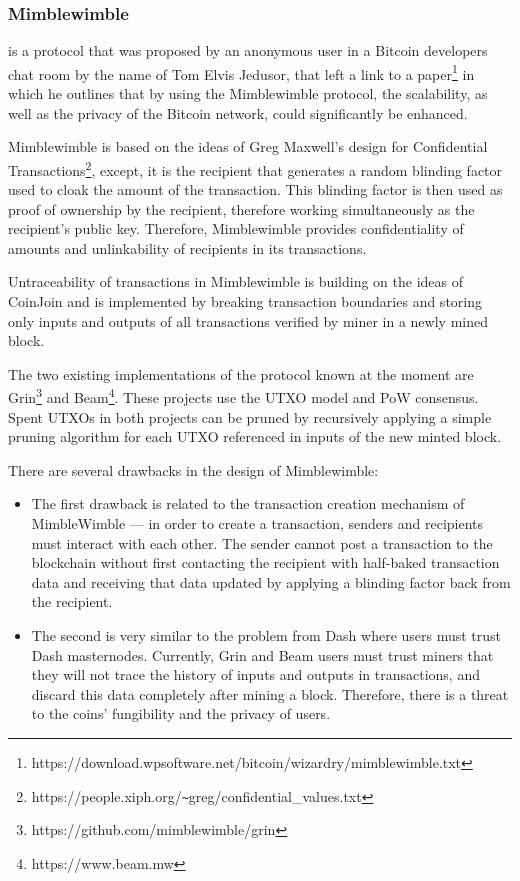 \documentclass[a4paper, 10pt, conference]{ieeeconf}
\begin{document}
\subsubsection{Mimblewimble} is a protocol that was proposed by an anonymous user in a Bitcoin developers chat room by the name of Tom Elvis Jedusor, that left a link to a paper\footnote{https://download.wpsoftware.net/bitcoin/wizardry/mimblewimble.txt} in which he outlines that by using the Mimblewimble protocol, the scalability, as well as the privacy of the Bitcoin network, could significantly be enhanced.

Mimblewimble is based on the ideas of Greg Maxwell's design for Confidential Transactions\footnote{https://people.xiph.org/\texttt{\~}greg/confidential\_values.txt}, except, it is the recipient that generates a random blinding factor used to cloak the amount of the transaction. This blinding factor is then used as proof of ownership by the recipient, therefore working simultaneously as the recipient's public key. Therefore, Mimblewimble provides confidentiality of amounts and unlinkability of recipients in its transactions.

Untraceability of transactions in Mimblewimble is building on the ideas of CoinJoin and is implemented by breaking transaction boundaries and storing only inputs and outputs of all transactions verified by miner in a newly mined block.

The two existing implementations of the protocol known at the moment are Grin\footnote{https://github.com/mimblewimble/grin} and Beam\footnote{https://www.beam.mw}. These projects use the UTXO model and PoW consensus. Spent UTXOs in both projects can be pruned by recursively applying a simple pruning algorithm for each UTXO referenced in inputs of the new minted block.

There are several drawbacks in the design of Mimblewimble:

\begin{itemize}
	\item {The first drawback is related to the transaction creation mechanism of MimbleWimble --- in order to create a transaction, senders and recipients must interact with each other. The sender cannot post a transaction to the blockchain without first contacting the recipient with half-baked transaction data and receiving that data updated by applying a blinding factor back from the recipient.}
	\item {The second is very similar to the problem from Dash where users must trust Dash masternodes. Currently, Grin and Beam users must trust miners that they will not trace the history of inputs and outputs in transactions, and discard this data completely after mining a block. Therefore, there is a threat to the coins' fungibility and the privacy of users.}
\end{itemize}
\end{document}
